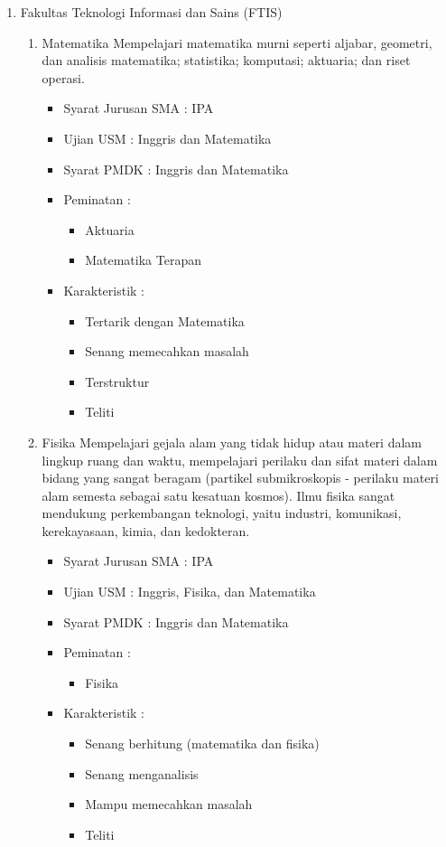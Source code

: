 \documentclass[a4paper,twoside]{article}
\begin{document}
\begin{enumerate}
\begin{enumerate}
			\item Fakultas Teknologi Informasi dan Sains (FTIS)
			\begin{enumerate}
				\item Matematika
					Mempelajari matematika murni seperti aljabar, geometri, dan analisis matematika; statistika; komputasi; aktuaria; dan riset operasi.
					\begin{itemize}
						\item Syarat Jurusan SMA : IPA
						\item Ujian USM : Inggris dan Matematika
						\item Syarat PMDK : Inggris dan Matematika
						\item Peminatan :
						\begin{itemize}
							\item Aktuaria
							\item Matematika Terapan
						\end{itemize}
						\item Karakteristik :
						\begin{itemize}
							\item Tertarik dengan Matematika
							\item Senang memecahkan masalah
							\item Terstruktur
							\item Teliti
						\end{itemize}
					\end{itemize}
					
				\item Fisika
					Mempelajari gejala alam yang tidak hidup atau materi dalam lingkup ruang dan waktu, mempelajari perilaku dan sifat materi dalam bidang yang sangat beragam (partikel submikroskopis - perilaku materi alam semesta sebagai satu kesatuan kosmos). Ilmu fisika sangat mendukung perkembangan teknologi, yaitu industri, komunikasi, kerekayasaan, kimia, dan kedokteran. 
					\begin{itemize}
						\item Syarat Jurusan SMA : IPA
						\item Ujian USM : Inggris, Fisika, dan Matematika
						\item Syarat PMDK : Inggris dan Matematika
						\item Peminatan :
						\begin{itemize}
							\item Fisika
						\end{itemize}
						\item Karakteristik :
						\begin{itemize}
							\item Senang berhitung (matematika dan fisika)
							\item Senang menganalisis
							\item Mampu memecahkan masalah
							\item Teliti
						\end{itemize}
					\end{itemize}
					

\end{enumerate}
\end{enumerate}
\end{enumerate}
\end{document}
